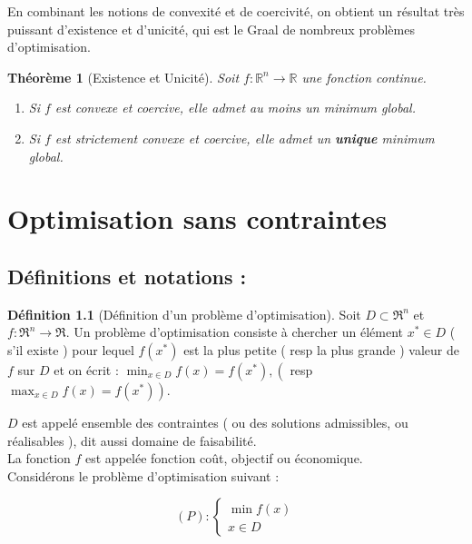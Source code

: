 \documentclass[a4paper,12pt,openany]{book}
\theoremstyle{plain}
\newtheorem{theorem}{Théorème}[section]
\theoremstyle{definition}
\newtheorem{definition}[theorem]{Définition}
\theoremstyle{remark}
\theoremstyle{nbstyle}
\newcommand{\R}{\mathbb{R}}
\begin{document}
	En combinant les notions de convexité et de coercivité, on obtient un résultat très puissant d'existence et d'unicité, qui est le Graal de nombreux problèmes d'optimisation.
	
	\begin{theorem}[Existence et Unicité]
		Soit $f: \R^n \to \R$ une fonction continue.
		\begin{enumerate}
			\item Si $f$ est convexe et coercive, elle admet au moins un minimum global.
			\item Si $f$ est strictement convexe et coercive, elle admet un \textbf{unique} minimum global.
		\end{enumerate}
	\end{theorem}
	
	
	\chapter{Optimisation sans contraintes}
	\section{Définitions et notations :}
	\begin{definition}[Définition d'un problème d'optimisation] Soit $D \subset \Re^{n}$ et $f: \Re^{n} \longrightarrow \Re$. Un problème d'optimisation consiste à chercher un élément $x^{*} \in D$ ( s'il existe ) pour lequel $f\left(x^{*}\right)$ est la plus petite ( resp la plus grande ) valeur de $f$ sur $D$ et on écrit : $\displaystyle\min _{x \in D} f(x)=f\left(x^{*}\right),\left(\right.$ resp $\left.\max _{x \in D} f(x)=f\left(x^{*}\right)\right)$.\\
	\end{definition}
	
	$D$ est appelé ensemble des contraintes ( ou des solutions admissibles, ou réalisables ), dit aussi domaine de faisabilité.\\
	La fonction $f$ est appelée fonction coût, objectif ou économique.\\
	Considérons le problème d'optimisation suivant :
	
	$$
	(P):\left\{\begin{array}{c}
	\displaystyle\min f(x) \\
	x \in D
	\end{array}\right.
	$$
	
\end{document}
